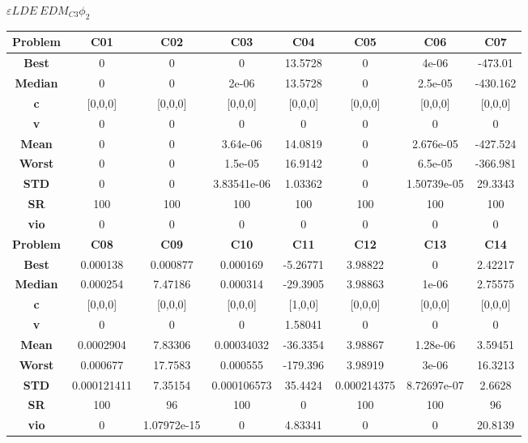\documentclass{IEEEtran}
\begin{document}
\begin{center}
$\varepsilon LDE\ EDM_{C3} \phi_2$ \\
  \begin{tabular}{|c|c|c|c|c|c|c|c|}
    \hline 
    \textbf{Problem} & \textbf{C01} & \textbf{C02} & \textbf{C03} & \textbf{C04} & \textbf{C05} & \textbf{C06} & \textbf{C07} \\ 
    \hline\hline 
    \textbf{Best} & 0 & 0 & 0 & 13.5728 & 0 & 4e-06 & -473.01\\ 
    \textbf{Median} & 0 & 0 & 2e-06 & 13.5728 & 0 & 2.5e-05 & -430.162\\ 
    \textbf{c} & [0,0,0] & [0,0,0] & [0,0,0] & [0,0,0] & [0,0,0] & [0,0,0] & [0,0,0]\\ 
    \textbf{v} & 0 & 0 & 0 & 0 & 0 & 0 & 0\\ 
    \textbf{Mean} & 0 & 0 & 3.64e-06 & 14.0819 & 0 & 2.676e-05 & -427.524\\ 
    \textbf{Worst} & 0 & 0 & 1.5e-05 & 16.9142 & 0 & 6.5e-05 & -366.981\\ 
    \textbf{STD} & 0 & 0 & 3.83541e-06 & 1.03362 & 0 & 1.50739e-05 & 29.3343\\ 
    \textbf{SR} & 100 & 100 & 100 & 100 & 100 & 100 & 100\\ 
    \textbf{vio} & 0 & 0 & 0 & 0 & 0 & 0 & 0\\ 
    \hline 
    \hline 
    \textbf{Problem} & \textbf{C08} & \textbf{C09} & \textbf{C10} & \textbf{C11} & \textbf{C12} & \textbf{C13} & \textbf{C14} \\ 
    \hline\hline 
    \textbf{Best} & 0.000138 & 0.000877 & 0.000169 & -5.26771 & 3.98822 & 0 & 2.42217\\ 
    \textbf{Median} & 0.000254 & 7.47186 & 0.000314 & -29.3905 & 3.98863 & 1e-06 & 2.75575\\ 
    \textbf{c} & [0,0,0] & [0,0,0] & [0,0,0] & [1,0,0] & [0,0,0] & [0,0,0] & [0,0,0]\\ 
    \textbf{v} & 0 & 0 & 0 & 1.58041 & 0 & 0 & 0\\ 
    \textbf{Mean} & 0.0002904 & 7.83306 & 0.00034032 & -36.3354 & 3.98867 & 1.28e-06 & 3.59451\\ 
    \textbf{Worst} & 0.000677 & 17.7583 & 0.000555 & -179.396 & 3.98919 & 3e-06 & 16.3213\\ 
    \textbf{STD} & 0.000121411 & 7.35154 & 0.000106573 & 35.4424 & 0.000214375 & 8.72697e-07 & 2.6628\\ 
    \textbf{SR} & 100 & 96 & 100 & 0 & 100 & 100 & 96\\ 
    \textbf{vio} & 0 & 1.07972e-15 & 0 & 4.83341 & 0 & 0 & 20.8139\\ 

\end{tabular}
\end{center}
\end{document}
